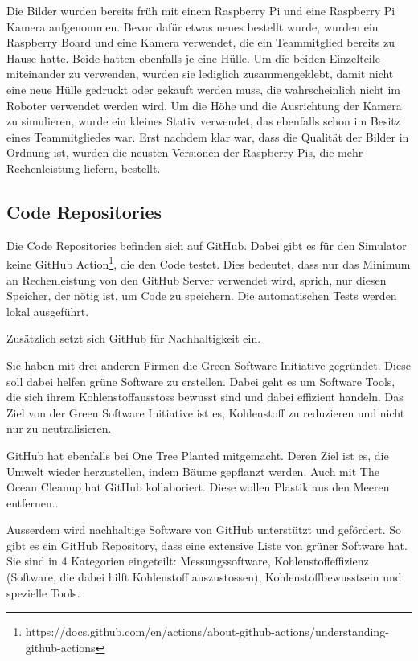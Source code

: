Die Bilder wurden bereits früh mit einem Raspberry Pi und eine Raspberry Pi Kamera aufgenommen. Bevor dafür etwas neues bestellt wurde, wurden ein Raspberry Board und eine Kamera verwendet, die ein Teammitglied bereits zu Hause hatte. Beide hatten ebenfalls je eine Hülle.
Um die beiden Einzelteile miteinander zu verwenden, wurden sie lediglich zusammengeklebt, damit nicht eine neue Hülle gedruckt oder gekauft werden muss, die wahrscheinlich nicht im Roboter verwendet werden wird.
Um die Höhe und die Ausrichtung der Kamera zu simulieren, wurde ein kleines Stativ verwendet, das ebenfalls schon im Besitz eines Teammitgliedes war.
Erst nachdem klar war, dass die Qualität der Bilder in Ordnung ist, wurden die neusten Versionen der Raspberry Pis, die mehr Rechenleistung liefern, bestellt.

\subsection{Code Repositories}

Die Code Repositories befinden sich auf GitHub. Dabei gibt es für den Simulator keine GitHub Action\footnote{https://docs.github.com/en/actions/about-github-actions/understanding-github-actions}, die den Code testet. Dies bedeutet, dass nur das Minimum an Rechenleistung von den GitHub Server verwendet wird, sprich, nur diesen Speicher, der nötig ist, um Code zu speichern. Die automatischen Tests werden lokal ausgeführt.

Zusätzlich setzt sich GitHub für Nachhaltigkeit ein.\cite{github-sustainability}

Sie haben mit drei anderen Firmen die Green Software Initiative gegründet. Diese soll dabei helfen grüne Software zu erstellen.  Dabei geht es um Software Tools, die sich ihrem Kohlenstoffausstoss bewusst sind und dabei effizient handeln. Das Ziel von der Green Software Initiative ist es, Kohlenstoff zu reduzieren und nicht nur zu neutralisieren.\cite{green-software-initiative}

GitHub hat ebenfalls bei One Tree Planted mitgemacht. Deren Ziel ist es, die Umwelt wieder herzustellen, indem Bäume gepflanzt werden\cite{one-tree-planted}. Auch mit The Ocean Cleanup hat GitHub kollaboriert. Diese wollen Plastik aus den Meeren entfernen.\cite{ocean-cleanup}.

Ausserdem wird nachhaltige Software von GitHub unterstützt und gefördert. So gibt es ein GitHub Repository, dass eine extensive Liste von grüner Software hat. Sie sind in 4 Kategorien eingeteilt: Messungssoftware, Kohlenstoffeffizienz (Software, die dabei hilft Kohlenstoff auszustossen), Kohlenstoffbewusstsein und spezielle Tools. \cite{green-software}


